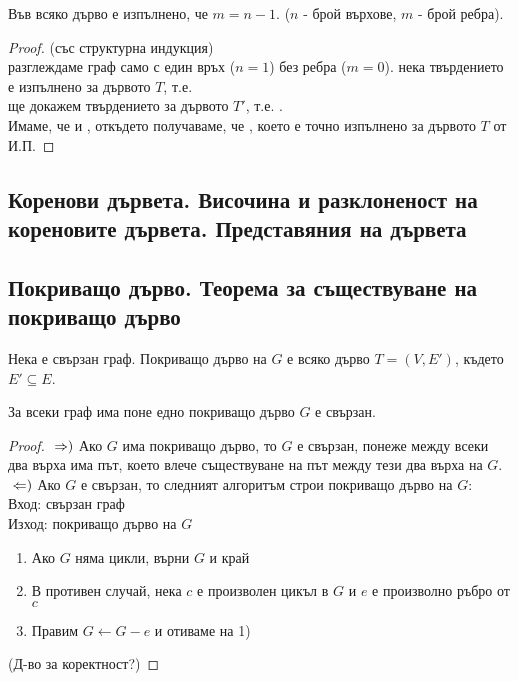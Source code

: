 \begin{theorem}
    Във всяко дърво е изпълнено, че \(m = n - 1\). (\(n\) - брой върхове, \(m\) - брой ребра).
\end{theorem}
\begin{proof}
    (със структурна индукция) \\
     разглеждаме граф само с един връх (\(n = 1\)) без ребра (\(m = 0\)).
     нека твърдението е изпълнено за дървото \(T\), т.е. 
     \\
     ще докажем твърдението за дървото \(T'\), т.е. . \\
    Имаме, че  и , откъдето получаваме, че 
    , което е точно изпълнено за дървото \(T\)
    от И.П.
\end{proof}

\subsection{Коренови дървета. Височина и разклоненост на кореновите дървета. Представяния на дървета}



\subsection{Покриващо дърво. Теорема за съществуване на покриващо дърво}
\begin{definition}
    Нека \graf е свързан граф. Покриващо дърво на \(G\) е всяко дърво \(T = (V, E')\), където \(E' \subseteq E\).
\end{definition}

\begin{theorem}
    За всеки граф \graf има поне едно покриващо дърво \totw \(G\) е свързан.
\end{theorem}
\begin{proof}
    \(\newline\Rightarrow)\) Ако \(G\) има покриващо дърво, то \(G\) е свързан, понеже между всеки два 
    върха има път, което влече съществуване на път между тези два върха на \(G\).
    \(\newline\Leftarrow)\) Ако \(G\) е свързан, то следният алгоритъм строи покриващо дърво на \(G\): \\
    Вход: свързан граф  \\
    Изход: покриващо дърво на \(G\)
    \begin{enumerate}
        \item Ако \(G\) няма цикли, върни \(G\) и край
        \item В противен случай, нека \(c\) е произволен цикъл в \(G\) и \(e\) е произволно ръбро от \(c\)
        \item Правим \(G \leftarrow G - e\) и отиваме на 1) 
    \end{enumerate}
    (Д-во за коректност?)
\end{proof}